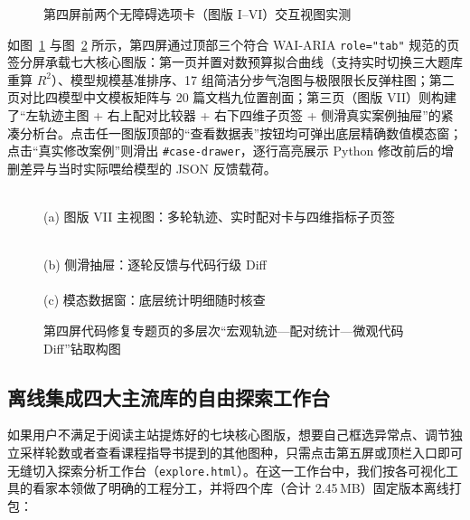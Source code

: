 \begin{figure}[!htbp]
\centering
{}\hfill
{}
\caption{第四屏前两个无障碍选项卡（图版 I–VI）交互视图实测}
\label{fig:s4-ab}
\end{figure}

如图~\ref{fig:s4-ab} 与图~\ref{fig:s4-c-grid} 所示，第四屏通过顶部三个符合 WAI-ARIA \texttt{role="tab"} 规范的页签分屏承载七大核心图版：第一页并置对数预算拟合曲线（支持实时切换三大题库重算 $R^2$）、模型规模基准排序、17 组简洁分步气泡图与极限限长反弹柱图；第二页对比四模型中文模板矩阵与 20 篇文档九位置剖面；第三页（图版 VII）则构建了“左轨迹主图 + 右上配对比较器 + 右下四维子页签 + 侧滑真实案例抽屉”的紧凑分析台。点击任一图版顶部的“查看数据表”按钮均可弹出底层精确数值模态窗；点击“真实修改案例”则滑出 \texttt{\#case-drawer}，逐行高亮展示 Python 修改前后的增删差异与当时实际喂给模型的 JSON 反馈载荷。

\begin{figure}[!htbp]
\centering
\begin{minipage}[c]{0.595\linewidth}
  \centering
  \\[4pt]
  {\fontsize{9.5bp}{12bp}\selectfont (a) 图版 VII 主视图：多轮轨迹、实时配对卡与四维指标子页签}
\end{minipage}\hfill
\begin{minipage}[c]{0.385\linewidth}
  \centering
  \\[2.5pt]
  {\fontsize{9bp}{11.5bp}\selectfont (b) 侧滑抽屉：逐轮反馈与代码行级 Diff}\\[5pt]
  \\[2.5pt]
  {\fontsize{9bp}{11.5bp}\selectfont (c) 模态数据窗：底层统计明细随时核查}
\end{minipage}
\caption{第四屏代码修复专题页的多层次“宏观轨迹—配对统计—微观代码 Diff”钻取构图}
\label{fig:s4-c-grid}
\end{figure}

\subsection{离线集成四大主流库的自由探索工作台}

如果用户不满足于阅读主站提炼好的七块核心图版，想要自己框选异常点、调节独立采样轮数或者查看课程指导书提到的其他图种，只需点击第五屏或顶栏入口即可无缝切入探索分析工作台（\texttt{explore.html}）。在这一工作台中，我们按各可视化工具的看家本领做了明确的工程分工，并将四个库（合计 2.45\,MB）固定版本离线打包：


